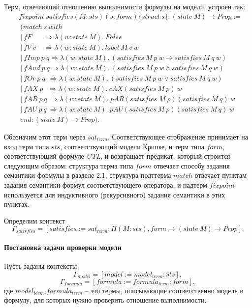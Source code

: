 \documentclass[12pt]{article}
\begin{document}
Терм, отвечающий отношению выполнимости формулы на модели, устроен так:
\begin{align*}
& fixpoint\ satisfies (M : sts) (s : form)\{struct\ s\}: (state\ M) \xrightarrow{} Prop := \\
&\  (match\ s\ with \\
&\ |\ fF \ \ \ \ \ \ \ \     \Rightarrow \lambda (w : state\ M).\ False\\
&\ |\ fV\ v \ \ \ \ \    \Rightarrow \lambda (w : state\ M).\ label\ M\ v\ w \\
&\ |\ fImp\ p\ q \Rightarrow \lambda (w : state\ M).\ (satisfies\ M\ p\ w \xrightarrow{} satisfies\ M\ q\ w) \\
&\ |\ fAnd\ p\ q \Rightarrow \lambda (w : state\ M).\ (satisfies\ M\ p\ w \wedge satisfies\ M\ q\ w) \\
&\ |\ fOr\ p\ q \ \ \Rightarrow \lambda (w : state\ M).\ (satisfies\ M\ p\ w \vee satisfies\ M\ q\ w) \\
&\ |\ fAX\ p \ \ \   \Rightarrow \lambda (w : state\ M).\ cAX (satisfies\ M\ p)\ w \\
&\ |\ fAR\ p\ q \ \Rightarrow \lambda (w : state\ M).\ pAR (satisfies\ M\ p) (satisfies\ M\ q)\ w \\
&\ |\ fAU\ p\ q \ \Rightarrow \lambda (w : state\ M).\ pAU (satisfies\ M\ p) (satisfies\ M\ q)\ w \\
&\ end: (state\ M) \xrightarrow{} Prop ).
\end{align*}

Обозначим этот терм через $sat_{term}$. 
Соответствующее отображение принимает на вход терм типа $sts$, соответствующий модели Крипке, и терм типа $form$, соответствующий формуле \textit{CTL}, и возвращает предикат, который строится следующим образом: структура терма типа $form$ отвечает способу задания семантики формулы в разделе 2.1, структура подттерма $match$ отвечает пунктам задания семантики формул соответствующего оператора, и надтерм $fixpoint$ используется для индуктивного (рекурсивного) задания семантики в этих пунктах.

Определим контекст 
$$\Gamma_{satisfies}=[satisfies:=sat_{term}:\Pi(M : sts), form \xrightarrow{} (state\ M) \xrightarrow{} Prop].$$

\paragraph{Постановка задачи проверки модели}\mbox{}

Пусть заданы контексты 
$$\Gamma_{model} = [model:=model_{term}:sts],$$ 
$$\Gamma_{formula} = [ formula :=formula_{term}:form],$$ где $model_{term}$,$formula_{term}$ -- это термы, описывающие соответственно модель и формулу, для которых нужно проверить отношение выполнимости.
 
\end{document}
